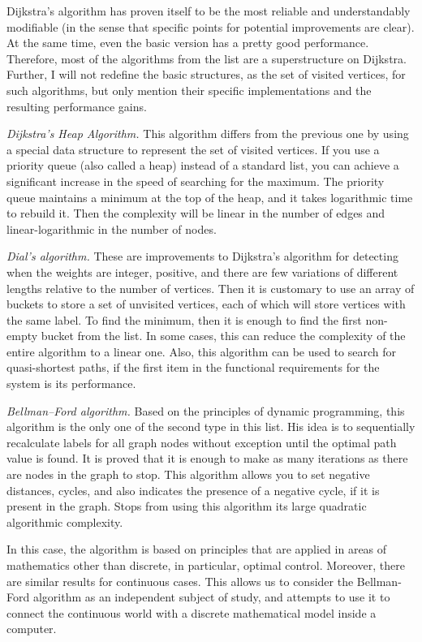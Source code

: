     Dijkstra's algorithm has proven itself to be the most reliable and understandably modifiable (in the sense that specific points for potential improvements are clear).
    At the same time, even the basic version has a pretty good performance.
    Therefore, most of the algorithms from the list are a superstructure on Dijkstra.
    Further, I will not redefine the basic structures, as the set of visited vertices, for such algorithms, but only mention their specific implementations and the resulting performance gains.

    \textit{Dijkstra's Heap Algorithm.}
    This algorithm differs from the previous one by using a special data structure to represent the set of visited vertices.
    If you use a priority queue (also called a heap) instead of a standard list, you can achieve a significant increase in the speed of searching for the maximum.
    The priority queue maintains a minimum at the top of the heap, and it takes logarithmic time to rebuild it.
    Then the complexity will be linear in the number of edges and linear-logarithmic in the number of nodes.
    
    \textit{Dial's algorithm.}
    These are improvements to Dijkstra's algorithm for detecting when the weights are integer, positive, and there are few variations of different lengths relative to the number of vertices.
    Then it is customary to use an array of buckets to store a set of unvisited vertices, each of which will store vertices with the same label.
    To find the minimum, then it is enough to find the first non-empty bucket from the list.
    In some cases, this can reduce the complexity of the entire algorithm to a linear one.
    Also, this algorithm can be used to search for quasi-shortest paths, if the first item in the functional requirements for the system is its performance.

    \textit{Bellman--Ford algorithm.}
    Based on the principles of dynamic programming, this algorithm is the only one of the second type in this list.
    His idea is to sequentially recalculate labels for all graph nodes without exception until the optimal path value is found.
    It is proved that it is enough to make as many iterations as there are nodes in the graph to stop.
    This algorithm allows you to set negative distances, cycles, and also indicates the presence of a negative cycle, if it is present in the graph.
    Stops from using this algorithm its large quadratic algorithmic complexity.

    In this case, the algorithm is based on principles that are applied in areas of mathematics other than discrete, in particular, optimal control.
    Moreover, there are similar results for continuous cases.
    This allows us to consider the Bellman-Ford algorithm as an independent subject of study, and attempts to use it to connect the continuous world with a discrete mathematical model inside a computer.

